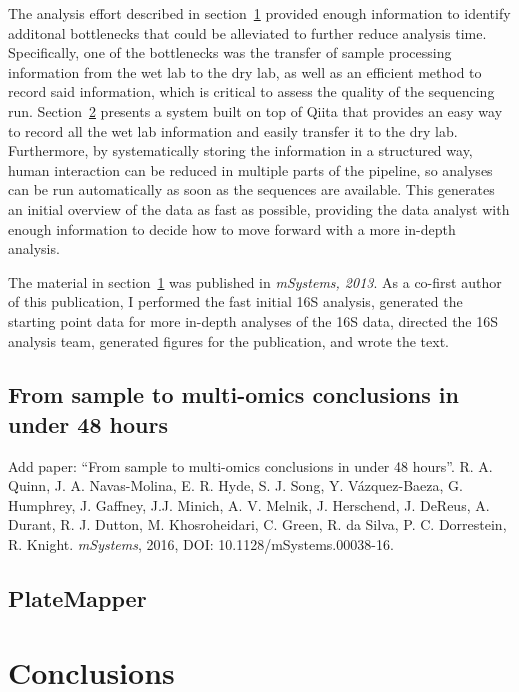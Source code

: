 \documentclass[12pt,chapterheads]{ucsd}
\begin{document}
The analysis effort described in section~\ref{section_48hours} provided enough
information to identify additonal bottlenecks that could be alleviated to further
reduce analysis time. Specifically, one of the bottlenecks was the transfer of sample
processing information from the wet lab to the dry lab, as well as an efficient
method to record said information, which is critical to assess the quality of the sequencing run.
Section~\ref{section_platemapper} presents a system built on top of Qiita that
provides an easy way to record all the wet lab information and easily transfer
it to the dry lab. Furthermore, by systematically storing the information in a
structured way, human interaction can be reduced in multiple parts of the pipeline,
so analyses can be run automatically as soon as the sequences are available.
This generates an initial overview of the data as fast as possible, providing
the data analyst with enough information to decide how to move forward with a
more in-depth analysis.

The material in section~\ref{section_48hours} was published in \textsl{mSystems, 2013}.
As a co-first author of this publication, I performed the fast initial 16S analysis,
generated the starting point data for more in-depth analyses of the 16S data,
directed the 16S analysis team, generated figures for the publication, and wrote the text.


\section{From sample to multi-omics conclusions in under 48 hours}\label{section_48hours}
Add paper: ``From sample to multi-omics conclusions in under 48 hours''. R. A. Quinn, J. A. Navas-Molina, E. R. Hyde, S. J. Song, Y. V\'azquez-Baeza, G. Humphrey, J. Gaffney, J.J. Minich, A. V. Melnik, J. Herschend, J. DeReus, A. Durant, R. J. Dutton, M. Khosroheidari, C. Green, R. da Silva, P. C. Dorrestein, R. Knight. \emph{mSystems}, 2016, DOI: 10.1128/mSystems.00038-16.

\section{PlateMapper}\label{section_platemapper}

\chapter{Conclusions}\label{chapter_conclusions}
\glsresetall
% 

\appendix


\printindex %


\end{document}
